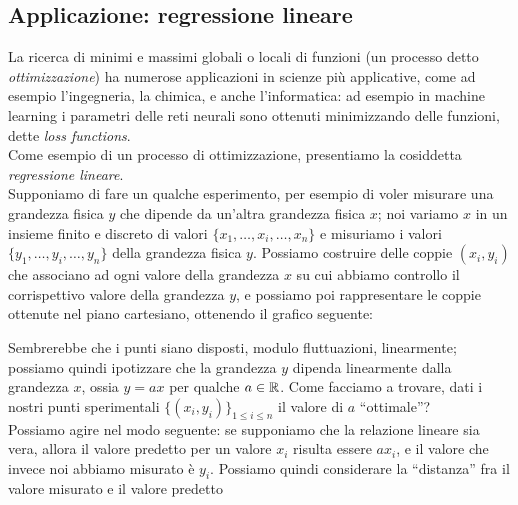 \subsection{Applicazione: regressione lineare}
\label{sec:7.3}
La ricerca di minimi e massimi globali o locali di funzioni (un processo detto \emph{ottimizzazione}) ha numerose applicazioni in scienze più applicative, come ad esempio l'ingegneria, la chimica, e anche l'informatica: ad esempio in machine learning i parametri delle reti neurali sono ottenuti minimizzando delle funzioni, dette \emph{loss functions}.\\
Come esempio di un processo di ottimizzazione, presentiamo la cosiddetta \emph{regressione lineare}.\\
Supponiamo di fare un qualche esperimento, per esempio di voler misurare una grandezza fisica $y$ che dipende da un'altra grandezza fisica $x$; noi variamo $x$ in un insieme finito e discreto di valori $\{x_1, \dots, x_i, \dots, x_n\}$ e misuriamo i valori $\{y_1, \dots, y_i, \dots, y_n\}$ della grandezza fisica $y$. Possiamo costruire delle coppie $(x_i, y_i)$ che associano ad ogni valore della grandezza $x$ su cui abbiamo controllo il corrispettivo valore della grandezza $y$, e possiamo poi rappresentare le coppie ottenute nel piano cartesiano, ottenendo il grafico seguente:
\begin{center}
\end{center}
Sembrerebbe che i punti siano disposti, modulo fluttuazioni, linearmente; possiamo quindi ipotizzare che la grandezza $y$ dipenda linearmente dalla grandezza $x$, ossia $y=ax$ per qualche $a\in\amsbb{R}$. Come facciamo a trovare, dati i nostri punti sperimentali $\{(x_i, y_i)\}_{1\le i\le n}$ il valore di $a$ ``ottimale''? \\
Possiamo agire nel modo seguente: se supponiamo che la relazione lineare sia vera, allora il valore predetto per un valore $x_i$ risulta essere $ax_i$, e il valore che invece noi abbiamo misurato è $y_i$. Possiamo quindi considerare la ``distanza'' fra il valore misurato e il valore predetto
